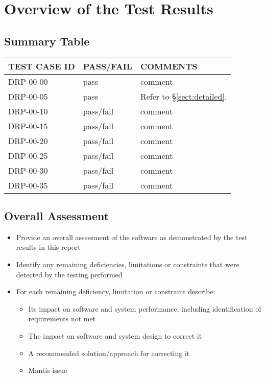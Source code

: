\documentclass[DM,lsstdraft,STR,toc]{lsstdoc}
\begin{document}
\newpage

\section{Overview of the Test Results}
\label{sect:overview}

\subsection{Summary Table}
\label{sect:summarytable}

\begin{longtable} {|p{}|p{}|p{}|}\hline
{\bf TEST CASE ID} & {\bf PASS/FAIL} & {\bf COMMENTS} \\\hline
DRP-00-00 & pass & comment \\\hline
DRP-00-05 & pass & Refer to \S\ref{sect:detailed}. \\\hline
DRP-00-10 & pass/fail & comment \\\hline
DRP-00-15 & pass/fail & comment \\\hline
DRP-00-20 & pass/fail & comment \\\hline
DRP-00-25 & pass/fail & comment \\\hline
DRP-00-30 & pass/fail & comment \\\hline
DRP-00-35 & pass/fail & comment \\\hline
\end{longtable}

\subsection{Overall Assessment \label{sect:overallassessment}}
\begin{itemize}
\item Provide an overall assessment of the software as demonstrated by the test results in this report
\item Identify any remaining deficiencies, limitations or constraints that were detected by the testing performed
\item For each remaining deficiency, limitation or constraint describe:
\begin{itemize}
\item Its impact on software and system performance, including identification of requirements not met
\item The impact on software and system design to correct it
\item A recommended solution/approach for correcting it
\item Mantis issue
\end{itemize}
\end{itemize}
\end{document}
